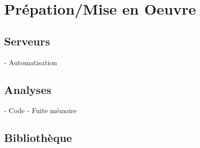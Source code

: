 \chapter{Prépation/Mise en Oeuvre}

\section{Serveurs}

- Automatisation

\section{Analyses}

- Code
- Fuite mémoire

\section{Bibliothèque}
